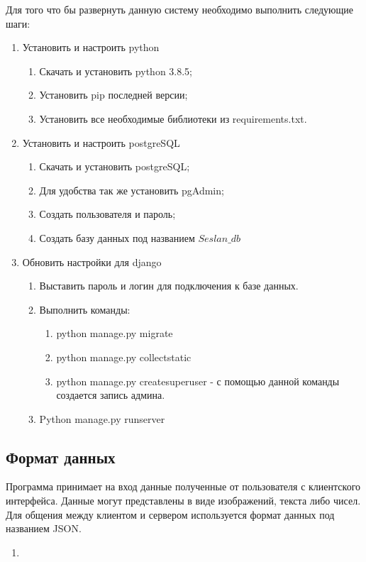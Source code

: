 	Для того что бы развернуть данную систему необходимо выполнить следующие шаги:
	\begin{enumerate}
		\item Установить и настроить python
		\begin{enumerate}
			\item Скачать и установить python 3.8.5;
			\item Установить pip последней версии;
			\item Установить все необходимые библиотеки из requirements.txt.
		\end{enumerate}
		\item Установить и настроить postgreSQL
		\begin{enumerate}
			\item Скачать и установить postgreSQL;
			\item Для удобства так же установить pgAdmin;
			\item Создать пользователя и пароль;
			\item Создать базу данных под названием $Seslan\_db$
		\end{enumerate}
		\item Обновить настройки для django
		\begin{enumerate}
			\item Выставить пароль и логин для подключения к базе данных.
			\item Выполнить команды:
			\begin{enumerate}
				\item python manage.py migrate
				\item python manage.py collectstatic
				\item python manage.py createsuperuser - с помощью данной команды создается запись админа.
			\end{enumerate}
			\item Python manage.py runserver
		\end{enumerate}
	\end{enumerate}

\subsection{Формат данных}

	Программа принимает на вход данные полученные от пользователя с клиентского интерфейса. Данные могут представлены в виде изображений, текста либо чисел. Для общения между клиентом и сервером используется формат данных под названием JSON.

	\begin{enumerate}
		\item 
	\end{enumerate}